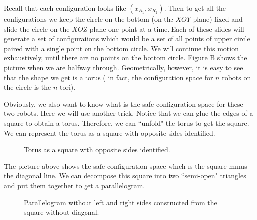 \documentclass[12pt]{article}
\theoremstyle{definition}
\begin{document}
Recall that each configuration looks like $(x_{R_1}, x_{R_2})$.
Then to get all the configurations we keep the circle on the bottom (on the $XOY$ plane) fixed and slide the circle
on the $XOZ$ plane one point at a time. Each of these slides will generate a set of configurations which would be a set
of all points of upper circle paired with a single point on the bottom circle. We will continue this motion exhaustively,
until there are no points on the bottom circle. Figure B shows the picture when we are halfway through. Geometrically,
however, it is easy to see that the shape we get is a torus (\cite{15} in fact, the configuration space for $n$ robots on
the circle is the $n$-tori).

\bigskip

Obviously, we also want to know what is the safe configuration space for these two robots.
Here we will use another trick. Notice that we can glue the edges of a square to obtain a torus.
Therefore, we can ``unfold" the torus to get the square. We can represent the torus as a square
with opposite sides identified.

\begin{figure}[H]
    \centering
    \caption*{Torus as a square with opposite sides identified.}
\end{figure}

The picture above shows the safe configuration space which is the square
minus the diagonal line. We can decompose this square into two ``semi-open"
triangles and put them together to get a parallelogram.

\begin{figure}[H]
    \centering
    \caption*{Parallelogram without left and right sides constructed from the square without diagonal.}
\end{figure}
\end{document}
